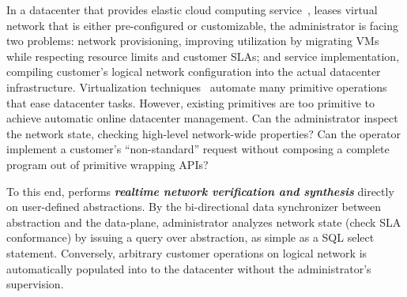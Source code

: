  In a datacenter that provides
elastic cloud computing service~\cite{aws-ec2,vm-sla,Portland}, leases
virtual network that is either pre-configured or customizable, the
administrator is facing two problems: network provisioning, \eg
improving utilization by migrating VMs while respecting resource
limits and customer SLAs; and service implementation, \eg compiling
customer's logical network configuration into the actual datacenter
infrastructure.  Virtualization
techniques~\cite{nv-survey,scalable-nv-sdn,virtual-forwarding-plane}
automate many primitive operations that ease datacenter
tasks. However, existing primitives are too primitive to achieve
automatic online datacenter management. Can the administrator inspect
the network state, checking high-level network-wide properties? Can
the operator implement a customer's ``non-standard'' request without
composing a complete program out of primitive wrapping APIs?


To this end, \Sys performs \textit{\textbf{realtime network
    verification and synthesis}} directly on user-defined
abstractions. By the bi-directional data synchronizer between
abstraction and the data-plane, administrator analyzes network state
(\eg check SLA conformance) by issuing a query over \Sys abstraction,
as simple as a SQL select statement. Conversely, arbitrary customer
operations on logical network is automatically populated into to the
datacenter without the administrator's
supervision. %


